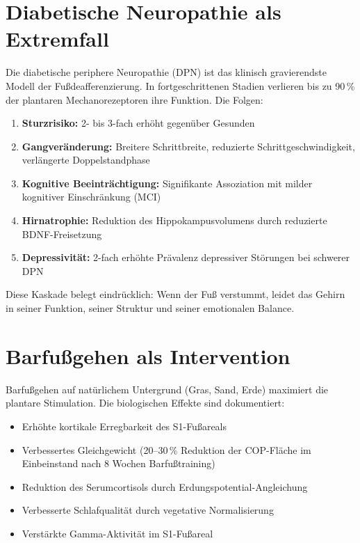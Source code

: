 ﻿\documentclass[12pt,a4paper]{report}
\theoremstyle{plain}
\theoremstyle{definition}
\theoremstyle{remark}
\begin{document}
\section{Diabetische Neuropathie als Extremfall}

Die diabetische periphere Neuropathie (DPN) ist das klinisch gravierendste
Modell der Fußdeafferenzierung. In fortgeschrittenen Stadien verlieren
bis zu 90\,\% der plantaren Mechanorezeptoren ihre Funktion. Die Folgen:

\begin{enumerate}
\item \textbf{Sturzrisiko:} 2- bis 3-fach erhöht gegenüber Gesunden
  \cite{richardson2004}
\item \textbf{Gangveränderung:} Breitere Schrittbreite, reduzierte
  Schrittgeschwindigkeit, verlängerte Doppelstandphase
\item \textbf{Kognitive Beeinträchtigung:} Signifikante Assoziation
  mit milder kognitiver Einschränkung (MCI) \cite{strachan2001}
\item \textbf{Hirnatrophie:} Reduktion des Hippokampusvolumens durch
  reduzierte BDNF-Freisetzung
\item \textbf{Depressivität:} 2-fach erhöhte Prävalenz depressiver
  Störungen bei schwerer DPN \cite{veglio2005}
\end{enumerate}

Diese Kaskade belegt eindrücklich: Wenn der Fuß verstummt, leidet das
Gehirn in seiner Funktion, seiner Struktur und seiner emotionalen Balance.

\section{Barfußgehen als Intervention}

Barfußgehen auf natürlichem Untergrund (Gras, Sand, Erde) maximiert die
plantare Stimulation. Die biologischen Effekte sind dokumentiert:

\begin{itemize}
\item Erhöhte kortikale Erregbarkeit des S1-Fußareals \cite{catani2005}
\item Verbessertes Gleichgewicht (20--30\,\% Reduktion der COP-Fläche
  im Einbeinstand nach 8 Wochen Barfußtraining)
\item Reduktion des Serumcortisols durch Erdungspotential-Angleichung
  \cite{chevalier2012}
\item Verbesserte Schlafqualität durch vegetative Normalisierung
\item Verstärkte Gamma-Aktivität im S1-Fußareal
\end{itemize}
\end{document}
